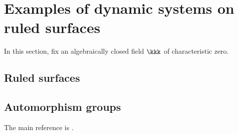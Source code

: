 \section{Examples of dynamic systems on ruled surfaces}

In this section, fix an algebraically closed field \(\kkk\) of characteristic zero.

\subsection{Ruled surfaces}

\subsection{Automorphism groups}

    The main reference is \cite{Mar71}.